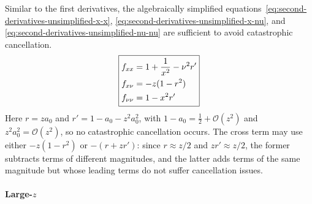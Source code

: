 \documentclass{article}
\begin{document}
Similar to the first derivatives, the algebraically simplified equations~\eqref{eq:second-derivatives-unsimplified-x-x}, \eqref{eq:second-derivatives-unsimplified-x-nu}, and \eqref{eq:second-derivatives-unsimplified-nu-nu} are sufficient to avoid catastrophic cancellation.
%
%
\begin{align}\label{eq:second-derivatives-small-z}
  \boxed{%
    \begin{aligned}
      f_{xx}     & = 1 + \frac{1}{x^2} - \nu^2 r' \\
      f_{x\nu}   & = -z (1 - r^2)                 \\
      f_{\nu\nu} & = 1 - x^2 r'
    \end{aligned}}
\end{align}
%
Here $r= z a_0$ and $r' = 1-a_0 - z^2 a_0^2$, with $1-a_0=\frac{1}{2}+\mathcal{O}(z^2)$ and $z^2 a_0^2=\mathcal{O}(z^2)$, so no catastrophic cancellation occurs.
The cross term may use either $-z(1-r^2)$ or $-(r+z r')$:
since $r \approx z/2$ and $zr' \approx z/2$, the former subtracts terms of different magnitudes, and the latter adds terms of the same magnitude but whose leading terms do not suffer cancellation issues.

\paragraph{Large-$z$}
\end{document}
